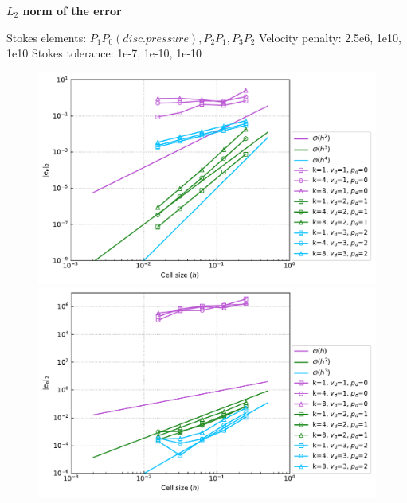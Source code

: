 \documentclass[12pt]{article}
\numberwithin{equation}{subsection}
\begin{document}
\newpage
\textbf{$L_{2}$ norm of the error}

\begin{adjustwidth}{1cm}{5cm}
	Stokes elements: $P_{1}P_{0} (disc. pressure), P_{2}P_{1}, P_{3}P_{2}$  \newline
	Velocity penalty: 2.5e6, 1e10, 1e10 \newline
	Stokes tolerance: 1e-7, 1e-10, 1e-10
\end{adjustwidth}


\begin{figure}[!htb]
	\begin{multicols}{1}
		\hspace{3.0in} \includegraphics[width=17cm]{../Annulus_Benchmark_Thieulot/benchmark_figs/vel_err_conv_vel_penalty_1.0e+10_stokes_tol_1.0e-10_all_k.pdf}
	\end{multicols}
	
	\begin{multicols}{1}
		\hspace{3.0in} \includegraphics[width=17cm]{../Annulus_Benchmark_Thieulot/benchmark_figs/p_err_conv_vel_penalty_1.0e+10_stokes_tol_1.0e-10_all_k.pdf}
	\end{multicols}
\end{figure}
\end{document}
